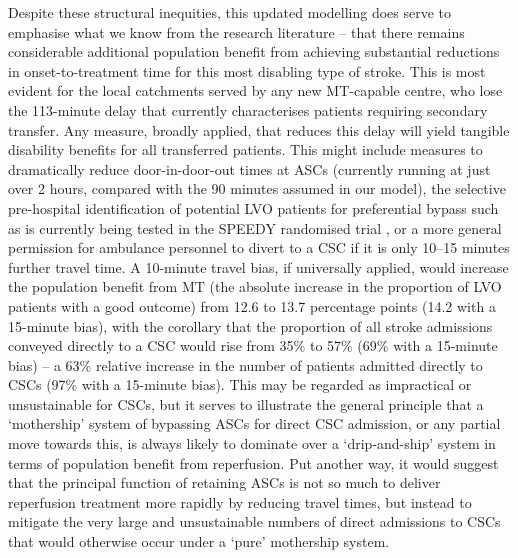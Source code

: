 Despite these structural inequities, this updated modelling does serve to emphasise what we know from the research literature -- that there remains considerable additional population benefit from achieving substantial reductions in onset-to-treatment time for this most disabling type of stroke. This is most evident for the local catchments served by any new MT-capable centre, who lose the 113-minute delay that currently characterises patients requiring secondary transfer. Any measure, broadly applied, that reduces this delay will yield tangible disability benefits for all transferred patients. This might include measures to dramatically reduce door-in-door-out times at ASCs (currently running at just over 2 hours, compared with the 90 minutes assumed in our model), the selective pre-hospital identification of potential LVO patients for preferential bypass such as is currently being tested in the SPEEDY randomised trial \cite{shaw2026speedy}, or a more general permission for ambulance personnel to divert to a CSC if it is only 10--15 minutes further travel time. A 10-minute travel bias, if universally applied, would increase the population benefit from MT (the absolute increase in the proportion of LVO patients with a good outcome) from 12.6 to 13.7 percentage points (14.2 with a 15-minute bias), with the corollary that the proportion of all stroke admissions conveyed directly to a CSC would rise from 35\% to 57\% (69\% with a 15-minute bias) -- a 63\% relative increase in the number of patients admitted directly to CSCs (97\% with a 15-minute bias). This may be regarded as impractical or unsustainable for CSCs, but it serves to illustrate the general principle that a `mothership' system of bypassing ASCs for direct CSC admission, or any partial move towards this, is always likely to dominate over a `drip-and-ship' system in terms of population benefit from reperfusion. Put another way, it would suggest that the principal function of retaining ASCs is not so much to deliver reperfusion treatment more rapidly by reducing travel times, but instead to mitigate the very large and unsustainable numbers of direct admissions to CSCs that would otherwise occur under a `pure' mothership system.

